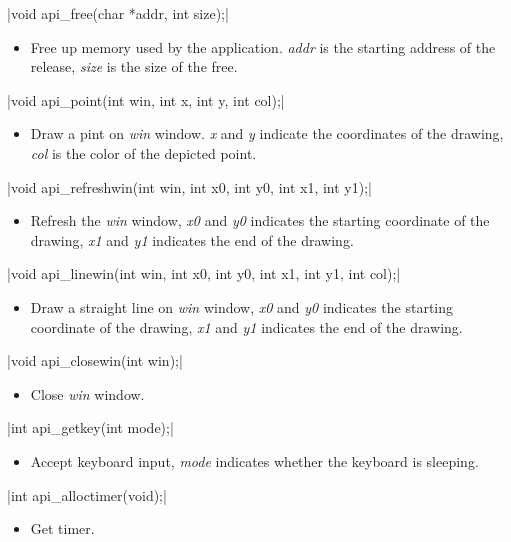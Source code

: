 \documentclass{swfcthesis}
\begin{document}
\csingle|void api_free(char *addr, int size);|
\begin{itemize}
\item Free up memory used by the application. \emph{addr} is the starting address of the
  release, \emph{size} is the size of the free.
\end{itemize}

\csingle|void api_point(int win, int x, int y, int col);|
\begin{itemize}
\item Draw a pint on \emph{win} window. \emph{x} and \emph{y} indicate the coordinates of
  the drawing, \emph{col} is the color of the depicted point.
  
\end{itemize}

\csingle|void api_refreshwin(int win, int x0, int y0, int x1, int y1);|
\begin{itemize}
\item Refresh the \emph{win} window, \emph{x0} and \emph{y0} indicates the starting
  coordinate of the drawing, \emph{x1} and \emph{y1} indicates the end of the drawing.
    
\end{itemize}

\csingle|void api_linewin(int win, int x0, int y0, int x1, int y1, int col);|
\begin{itemize}
\item Draw a straight line on \emph{win} window, \emph{x0} and \emph{y0} indicates the
  starting coordinate of the drawing, \emph{x1} and \emph{y1} indicates the end of the
  drawing.
  
\end{itemize}

\csingle|void api_closewin(int win);|
\begin{itemize}
\item Close \emph{win} window.
\end{itemize}

\csingle|int api_getkey(int mode);|
\begin{itemize}
\item Accept keyboard input, \emph{mode} indicates whether the keyboard is sleeping.
\end{itemize}

\csingle|int api_alloctimer(void);|
\begin{itemize}
\item Get timer.
\end{itemize}
\end{document}
